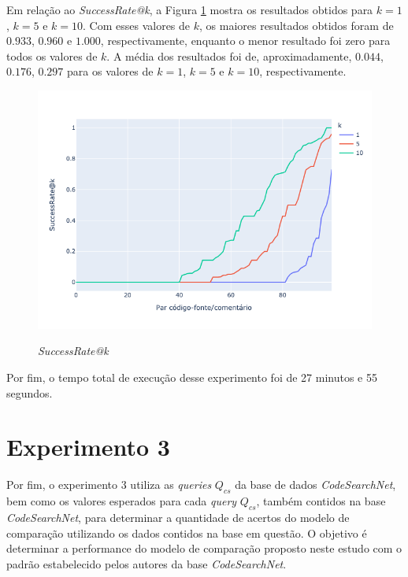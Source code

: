 Em relação ao \textit{SuccessRate@k}, a Figura \ref{fig:experiment-2-success-k} mostra os resultados obtidos para $k=1$, $k=5$ e $k=10$. Com esses valores de $k$, os maiores resultados obtidos foram de $0.933$, $0.960$ e $1.000$, respectivamente, enquanto o menor resultado foi zero para todos os valores de $k$. A média dos resultados foi de, aproximadamente, $0.044$, $0.176$, $0.297$ para os valores de $k=1$, $k=5$ e $k=10$, respectivamente.

\begin{figure}[H]
  \centering
      \caption{\textit{SuccessRate@k}}
      \includegraphics[scale=0.6]{imagens/resultados/experiment-2/success-rates.png}
      \label{fig:experiment-2-success-k}
\end{figure}

Por fim, o tempo total de execução desse experimento foi de 27 minutos e 55 segundos.

\section{Experimento 3} 
\label{sec:results:experiment-3}
Por fim, o experimento 3 utiliza as \textit{queries} $Q_{cs}$ da base de dados \textit{CodeSearchNet}, bem como os valores esperados para cada \textit{query} $Q_{cs}$, também contidos na base \textit{CodeSearchNet}, para determinar a quantidade de acertos do modelo de comparação utilizando os dados contidos na base em questão. O objetivo é determinar a performance do modelo de comparação proposto neste estudo com o padrão estabelecido pelos autores da base \textit{CodeSearchNet}.

